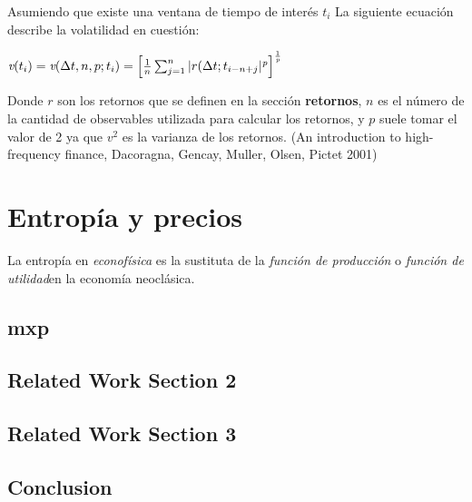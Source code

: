 Asumiendo que existe una ventana de tiempo de interés  $t_{i}$ La siguiente ecuación describe la volatilidad en cuestión:

\begin{center}

$\textit{v}(t_{i}) = \textit{v}(\Delta t, n, p; t_{i}) = \Bigl[ \frac{1}{n} \sum_{j = 1}^{n} |r (\Delta t ; t_{i-n+j}|^{\textit{p}} \Bigr]^\frac{1}{\textit{p}}$

\end{center}

Donde $\textit{r}$ son los retornos que se definen en la sección \textbf{retornos}, $\textit{n}$ es el número de la cantidad de observables utilizada para calcular los retornos, y $\textit{p}$ suele tomar el valor de 2 ya que $\textit{v}^{2}$ es la varianza de los retornos.  (An introduction to high-frequency finance, Dacoragna, Gencay, Muller, Olsen, Pictet 2001)



%
%
%
%
%
\chapter{Entropía y precios}
\label{sec:related}


La entropía en \textit{econofísica} es la sustituta de la \textit{función de producción} o \textit{función de utilidad}en la economía neoclásica. 

\section{ mxp}
\label{mxp}

\Blindtext[2][2]

\section{Related Work Section 2}
\label{sec:related:sec2}

\Blindtext[3][2]

\section{Related Work Section 3}
\label{sec:related:sec3}

\Blindtext[4][2]

\section{Conclusion}
\label{sec:related:conclusion}

\Blindtext[2][1]
